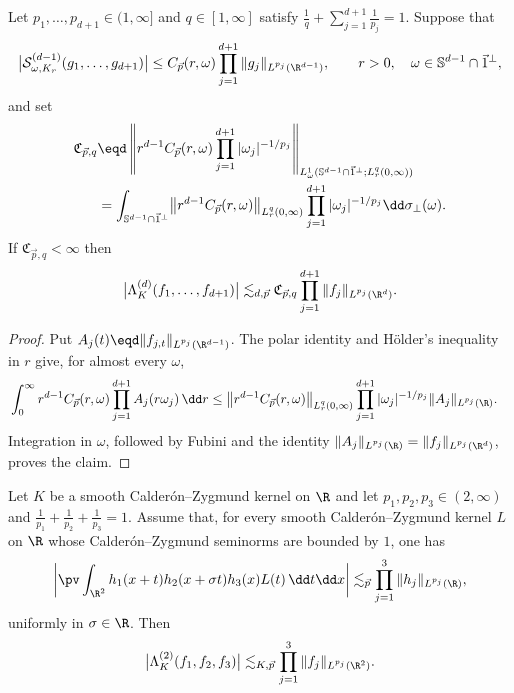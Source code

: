 \begin{corollary}
\label{cor:uniform-sliced-bound-reduction}
Let $p_1,\ldots,p_{d+1}\in(1,\infty]$ and $q\in[1,\infty]$ satisfy \(\frac{1}{q}+\sum_{j=1}^{d+1}\frac{1}{p_j}=1\).
Suppose that
\[
\bigl|\mathcal{S}_{\omega,K_r}^{(d-1)} (g_1,\ldots,g_{d+1})\bigr| \le C_{\vec p}(r,\omega) \prod_{j=1}^{d+1}\|g_j\|_{L^{p_j}(\R^{d-1})},
\qquad r>0,\quad \omega\in\mathbb{S}^{d-1}\cap\vec{1}^{\perp},
\]
and set
\[
\begin{aligned}
\mathfrak {C}_{\vec p,q}
&\eqd\left\|r^{d-1}C_{\vec p}(r,\omega) \prod_{j=1}^{d+1}|\omega_j|^{-1/p_j}\right\|_{ L^1_\omega(\mathbb{S}^{d-1}\cap\vec{1}^{\perp};L^q_r(0,\infty))}
\\
&= \int_{\mathbb{S}^{d-1}\cap\vec{1}^{\perp}} \bigl\|r^{d-1}C_{\vec p}(r,\omega)\bigr\|_{L^q_r(0,\infty)} \prod_{j=1}^{d+1}|\omega_j|^{-1/p_j} \dd\sigma_\perp(\omega).
\end{aligned}
\]
If \(\mathfrak {C}_{\vec p,q} <\infty\) then
\[
\bigl|\Lambda_K^{(d)}(f_1,\ldots,f_{d+1})\bigr| \lesssim_{d,\vec p} \mathfrak {C}_{\vec p,q} \prod_{j=1}^{d+1}\|f_j\|_{L^{p_j}(\R^d)}.
\]
\end{corollary}

\begin{proof}
Put $A_j(t)\eqd\|f_{j,t}\|_{L^{p_j}(\R^{d-1})}$.
The polar identity and Hölder's inequality in $r$ give, for almost every $\omega$,
\[
\begin{aligned}
& \int_0^\infty r^{d-1}C_{\vec p}(r,\omega) \prod_{j=1}^{d+1}A_j(r\omega_j)\,\dd r
\le \bigl\|r^{d-1}C_{\vec p}(r,\omega)\bigr\|_{L^q_r(0,\infty)} \prod_{j=1}^{d+1}|\omega_j|^{-1/p_j} \|A_j\|_{L^{p_j}(\R)}.
\end{aligned}
\]
Integration in $\omega$, followed by Fubini and the identity $\|A_j\|_{L^{p_j}(\R)}=\|f_j\|_{L^{p_j}(\R^d)}$, proves the claim.
\end{proof}

\begin{corollary}
\label{cor:symmetric-slicing-plane}
Let $K$ be a smooth Calderón--Zygmund kernel on $\R$ and let $p_1,p_2,p_3\in(2,\infty)$ and \( \frac1{p_1}+\frac1{p_2}+\frac1{p_3}=1 \).
Assume that, for every smooth Calderón--Zygmund kernel $L$ on $\R$ whose Calderón--Zygmund seminorms are bounded by $1$, one has
\[
\left|\pv\int_{\R^2} h_1(x+t)h_2(x+\sigma t)h_3(x)L(t)\,\dd t\dd x\right|
\lesssim_{\vec p} \prod_{j=1}^3\|h_j\|_{L^{p_j}(\R)},
\]
uniformly in $\sigma\in\R$. Then
\[
\bigl|\Lambda_K^{(2)}(f_1,f_2,f_3)\bigr| \lesssim_{K,\vec p} \prod_{j=1}^3\|f_j\|_{L^{p_j}(\R^2)}.
\]
\end{corollary}

